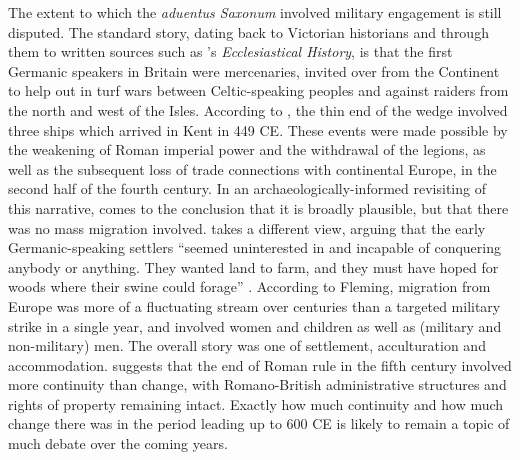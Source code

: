 \noindent The extent to which the \emph{aduentus Saxonum} involved military engagement is still disputed. The standard story, dating back to Victorian historians and through them to written sources such as 's \emph{Ecclesiastical History}, is that the first Germanic speakers in Britain were mercenaries, invited over from the Continent to help out in turf wars between Celtic-speaking peoples and against raiders from the north and west of the Isles. According to , the thin end of the wedge involved three ships which arrived in Kent in 449 CE. These events were made possible by the weakening of Roman imperial power and the withdrawal of the legions, as well as the subsequent loss of trade connections with continental Europe, in the second half of the fourth century. In an archaeologically-informed revisiting of this narrative, \citet[104]{Higham2013} comes to the conclusion that it is broadly plausible, but that there was no mass migration involved. \citet{Fleming2010} takes a different view, arguing that the early Germanic-speaking settlers ``seemed uninterested in and incapable of conquering anybody or anything. They wanted land to farm, and they must have hoped for woods where their swine could forage'' \citeyearpar[40]{Fleming2010}. According to Fleming, migration from Europe was more of a fluctuating stream over centuries than a targeted military strike in a single year, and involved women and children as well as (military and non-military) men. The overall story was one of settlement, acculturation and accommodation. \citet{Oosthuizen2019} suggests that the end of Roman rule in the fifth century involved more continuity than change, with Romano-British administrative structures and rights of property remaining intact. Exactly how much continuity and how much change there was in the period leading up to 600 CE is likely to remain a topic of much debate over the coming years.

